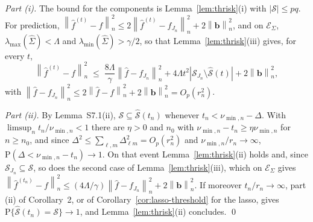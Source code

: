 \documentclass[10pt]{book}
\theoremstyle{definition}
\newcommand{\Prob}{\mathrm{P}}
\newcommand{\normn}[1]{\left\lVert #1 \right\rVert_{n}}
\newcommand{\cv}{\ell}
\newcommand{\md}{m}
\newcommand{\Gramhat}{\widehat{\Sigma}}
\newcommand{\bb}{\mathbf{b}}
\newcommand{\lmin}{\lambda_{\min}}
\newcommand{\lmaxx}{\lambda_{\max}}
\newcommand{\ESig}{\mathcal{E}_{\Sigma}}
\newcommand{\Dbl}{\Delta_{\cv\md}}
\begin{document}
{\emph{Part (i).} The bound for the components is Lemma~\ref{lem:thrisk}(i)
with $|\mathcal{S}| \le pq$. For prediction,
$\normn{\widehat{f}^{(t)}-f}^{2} \le 2\normn{\widehat{f}^{(t)}-f_{J_n}}^{2} +
2\normn{\bb}^{2}$, and on $\ESig$, $\lmaxx(\Gramhat) < \Lambda$ and
$\lmin(\Gramhat) > \gamma/2$, so that Lemma~\ref{lem:thrisk}(iii) gives, for
every $t$,
\[
  \normn{\widehat{f}^{(t)}-f}^{2} \;\le\;
  \frac{8\Lambda}{\gamma}\normn{\widehat{f}-f_{J_n}}^{2}
  + 4\Lambda t^{2}|\mathcal{S}_{J_n}\setminus\widehat{\mathcal{S}}(t)|
  + 2\normn{\bb}^{2},
\]
with $\normn{\widehat{f}-f_{J_n}}^{2} \le 2\normn{\widehat{f}-f}^{2} +
2\normn{\bb}^{2} = O_p(r_n^{2})$.

\emph{Part (ii).} By Lemma~S7.1(ii), $\mathcal{S} \subseteq
\widehat{\mathcal{S}}(t_n)$ whenever $t_n < \nu_{\min,n} - \Delta$. With
$\limsup_n t_n/\nu_{\min,n} < 1$ there are $\eta > 0$ and $n_0$ with
$\nu_{\min,n} - t_n \ge \eta\nu_{\min,n}$ for $n \ge n_0$, and since
$\Delta^{2} \le \sum_{\cv,\md}\Dbl^{2} = O_p(r_n^{2})$ and
$\nu_{\min,n}/r_n \to \infty$, $\Prob(\Delta < \nu_{\min,n} - t_n) \to 1$. On
that event Lemma~\ref{lem:thrisk}(ii) holds and, since
$\mathcal{S}_{J_n} \subseteq \mathcal{S}$, so does the second case of
Lemma~\ref{lem:thrisk}(iii), which on $\ESig$ gives
$\normn{\widehat{f}^{(t_n)}-f}^{2} \le
(4\Lambda/\gamma)\normn{\widehat{f}-f_{J_n}}^{2} + 2\normn{\bb}^{2}$. If
moreover $t_n/r_n \to \infty$, part (ii) of Corollary~2, or of
Corollary~\ref{cor:lasso-threshold} for the lasso, gives
$\Prob\{\widehat{\mathcal{S}}(t_n) = \mathcal{S}\} \to 1$, and
Lemma~\ref{lem:thrisk}(ii) concludes. \qed

}
\end{document}
